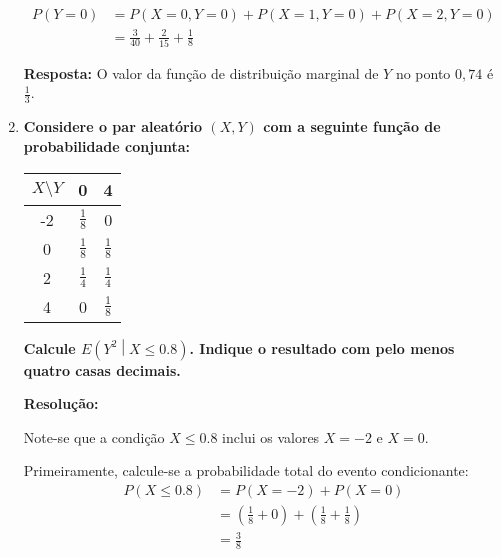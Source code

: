 \documentclass[a4paper,12pt]{article}
\begin{document}
\begin{enumerate}
\begin{mdframed}[backgroundcolor=gray!10, linewidth=0pt, innertopmargin=10pt, innerbottommargin=10pt]
  \begin{align*}
    P(Y = 0) &= P(X = 0, Y = 0) + P(X = 1, Y = 0) + P(X = 2, Y = 0) \\
             &= \frac{3}{40} + \frac{2}{15} + \frac{1}{8}
  \end{align*}
  
  \textbf{Resposta:} O valor da função de distribuição marginal de $Y$ no ponto $0,74$ é $\frac{1}{3}$.
  \end{mdframed}

  \vspace{0.5cm}

  \item \textbf{Considere o par aleatório \( (X, Y) \) com a seguinte função de probabilidade conjunta:} 

  \vspace{0.3cm}

  \begin{center}
    \small                      
    \renewcommand{\arraystretch}{1.8}
    \setlength{\tabcolsep}{12pt}
    \begin{tabular}{|c|c|c|}
      \hline
      \( X \setminus Y \) & 0 & 4 \\ \hline
      -2 & \(\frac{1}{8}\) & 0 \\ \hline
      0 & \(\frac{1}{8}\) & \(\frac{1}{8}\) \\ \hline
      2 & \(\frac{1}{4}\) & \(\frac{1}{4}\) \\ \hline
      4 & 0 & \(\frac{1}{8}\) \\ \hline
    \end{tabular}
  \end{center}

  \textbf{Calcule \( E\left( Y^2 \middle| X \leq 0.8 \right) \). Indique o resultado com pelo menos quatro casas decimais.}

  \vspace{0.3cm}

  \begin{mdframed}[backgroundcolor=gray!10, linewidth=0pt, innertopmargin=10pt, innerbottommargin=10pt]
  \textbf{Resolução:}
  
  Note-se que a condição \( X \leq 0.8 \) inclui os valores \( X = -2 \) e \( X = 0 \). 
  
  Primeiramente, calcule-se a probabilidade total do evento condicionante:
  \begin{align*}
    P(X \leq 0.8) &= P(X = -2) + P(X = 0) \\
    &= \left(\frac{1}{8} + 0\right) + \left(\frac{1}{8} + \frac{1}{8}\right) \\
    &= \frac{3}{8}
  \end{align*}


\end{mdframed}
\end{enumerate}
\end{document}
